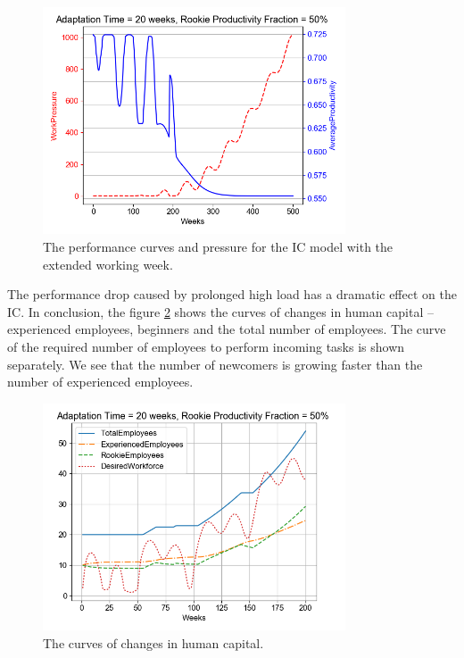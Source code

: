 \documentclass[12pt]{report}
\theoremstyle{definition}
\begin{document}
\begin{figure}[ht]
	\centering
	\includegraphics[width=0.8\textwidth]{icmon8}
	\caption{The performance curves and pressure for the IC model with the extended working week.}
	\label{fig:icmon8}
\end{figure} 

The performance drop caused by prolonged high load has a dramatic effect on the IC. 
In conclusion, the figure \ref{fig:icmon9} shows the curves of changes in human capital -- experienced employees, beginners and the total number of employees.  The curve of the required number of employees to perform incoming tasks is shown separately. 
We see that the number of newcomers is growing faster than the number of experienced employees.

\begin{figure}[ht]
	\centering
	\includegraphics[width=0.8\textwidth]{icmon9}
	\caption{The curves of changes in human capital.}
	\label{fig:icmon9}
\end{figure} 
\end{document}
